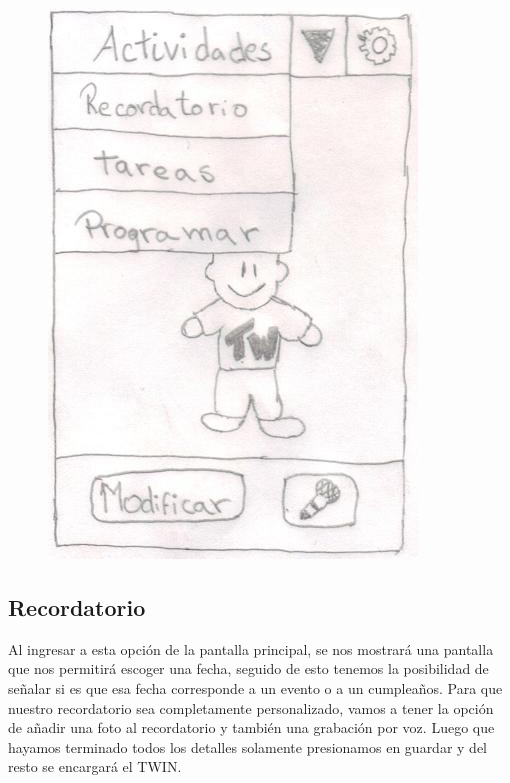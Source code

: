 \documentclass[12pt]{article}
\begin{document}
\begin{figure}[h]
\centering
\vspace{0.3in}\includegraphics[scale=0.5]{Twin3}
\end{figure}

\newpage
\subsection{Recordatorio}
Al ingresar a esta opci\'on de la pantalla principal, se nos mostrar\'a una pantalla que nos permitir\'a escoger una fecha, seguido de esto tenemos la posibilidad de se\~nalar si es que esa fecha corresponde a un evento o a un cumpleaños. 
Para que nuestro recordatorio sea completamente personalizado, vamos a tener la opci\'on de a\~nadir una foto al recordatorio y tambi\'en una grabaci\'on por voz. 
Luego que hayamos terminado todos los detalles solamente presionamos en guardar y del resto se encargar\'a el TWIN.
\end{document}
